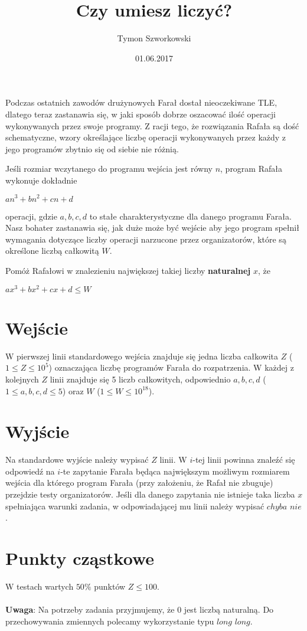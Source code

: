 \documentclass[zad,zawodnik,utf8]{sinol}
\title{Czy umiesz liczyć?}
\author{Tymon Szworkowski} %
\date{01.06.2017}
\begin{document}
\begin{tasktext}

Podczas ostatnich zawodów drużynowych Farał dostał nieoczekiwane TLE, dlatego teraz zastanawia się, w jaki sposób dobrze oszacować ilość operacji wykonywanych przez swoje programy. Z racji tego, że rozwiązania Rafała są dość schematyczne, wzory określające liczbę operacji wykonywanych przez każdy z jego programów zbytnio się od siebie nie różnią.

Jeśli rozmiar wczytanego do programu wejścia jest równy $n$, program Rafała wykonuje dokładnie
\begingroup
    \fontsize{13pt}{12pt}\selectfont
	\begin{center}
	$an^3 + bn^2 + cn + d$ 
	\end{center}
\endgroup	
operacji, gdzie $a, b, c, d$ to stałe charakterystyczne dla danego programu Farała. Nasz bohater zastanawia się, jak duże może być wejście aby jego program spełnił wymagania dotyczące liczby operacji narzucone przez organizatorów, które są określone liczbą całkowitą $W$.

Pomóż Rafałowi w znalezieniu największej takiej liczby \textbf{naturalnej} $x$, że
\begingroup
    \fontsize{13pt}{12pt}\selectfont
	\begin{center}
	$ax^3 + bx^2 + cx + d \leq W$ 
	\end{center}
\endgroup	

\section{Wejście}

W pierwszej linii standardowego wejścia znajduje się jedna liczba całkowita $Z$ ($1 \leq Z \leq 10^5$) oznaczająca liczbę programów Farała do rozpatrzenia.  W każdej z kolejnych $Z$ linii znajduje się 5 liczb całkowitych, odpowiednio $a, b, c, d$ ($1 \leq a, b, c, d \leq 5$) oraz $W$ ($1 \leq W \leq 10^{18}$).

\section{Wyjście}
Na standardowe wyjście należy wypisać $Z$ linii. W $i$-tej linii powinna znaleźć się odpowiedź na $i$-te zapytanie Farała będąca największym możliwym rozmiarem wejścia dla którego program Farała (przy założeniu, że Rafał nie zbuguje) przejdzie testy organizatorów. Jeśli dla danego zapytania nie istnieje taka liczba $x$ spełniająca warunki zadania, w odpowiadającej mu linii należy wypisać $chyba$ $nie$.
	\makecompactexample
	
\section{Punkty cząstkowe}
W testach wartych $50\%$ punktów $Z \leq 100$.
\\
\\
\textbf{Uwaga}: Na potrzeby zadania przyjmujemy, że $0$ jest liczbą naturalną. Do przechowywania zmiennych polecamy wykorzystanie typu $long$ $long$.

\end{tasktext}
\end{document}
